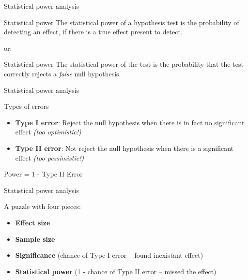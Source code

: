 \documentclass[compress]{beamer}
\begin{document}
\begin{frame}{Statistical power analysis}

\begin{exampleblock}{Statistical power}
    The statistical power of a hypothesis test is the probability of detecting an effect, if there is a true effect present to detect.
\end{exampleblock}

or:

\begin{exampleblock}{Statistical power}
    The statistical power of the test is the probability that
    the test correctly rejects a \emph{false} null hypothesis.
\end{exampleblock}


\end{frame}

\begin{frame}{Statistical power analysis}


\begin{exampleblock}{Types of errors}
    \begin{itemize}
        \item \textbf{Type I error}: Reject the null hypothesis when there is in
            fact no significant effect \emph{(too optimistic!)}
        \item \textbf{Type II error}: Not reject the null hypothesis when there
            is a significant effect \emph{(too pessimistic!)}
    \end{itemize}
\end{exampleblock}

    \pause

    \Large
    \centering
    \bf

    Power = 1 - Type II Error

\end{frame}

\begin{frame}{Statistical power analysis}

A puzzle with four pieces:

    \begin{itemize}
        \item \textbf{Effect size}
        \item \textbf{Sample size}
        \item \textbf{Significance} (chance of Type I error -- found inexistant
            effect)
        \item \textbf{Statistical power} (1 - chance of Type II error -- missed the effect)

    \end{itemize}
\end{frame}
\end{document}
